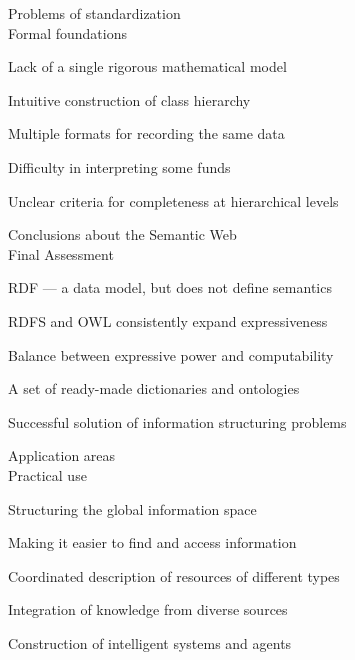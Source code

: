 \begin{frame}{Problems of standardization\\Formal foundations}
	\topline
	\justifying
	\begin{textitemize}
		\item Lack of a single rigorous mathematical model
		\item Intuitive construction of class hierarchy
		\item Multiple formats for recording the same data
		\item Difficulty in interpreting some funds
		\item Unclear criteria for completeness at hierarchical levels
	\end{textitemize}
\end{frame}

\begin{frame}{Conclusions about the Semantic Web\\Final Assessment}
	\topline
	\justifying
	\begin{textitemize}
		\item RDF --- a data model, but does not define semantics
		\item RDFS and OWL consistently expand expressiveness
		\item Balance between expressive power and computability
		\item A set of ready-made dictionaries and ontologies
		\item Successful solution of information structuring problems
	\end{textitemize}
\end{frame}

\begin{frame}{Application areas\\Practical use}
	\topline
	\justifying
	\begin{textitemize}
		\item Structuring the global information space
		\item Making it easier to find and access information
		\item Coordinated description of resources of different types
		\item Integration of knowledge from diverse sources
		\item Construction of intelligent systems and agents
	\end{textitemize}
\end{frame}

